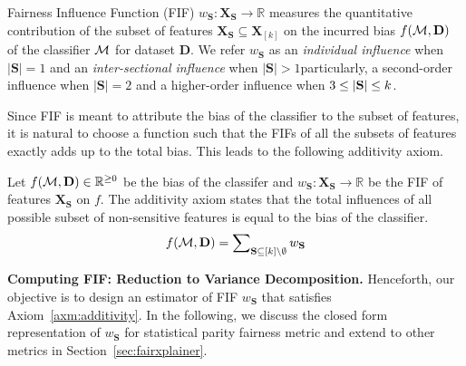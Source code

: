 \begin{definition}
Fairness Influence Function (FIF) $ w_{\mathbf{S}}:\mathbf{X}_{\mathbf{S}} \rightarrow \mathbb{R} $ measures the quantitative contribution of the subset of features $ \mathbf{X}_{\mathbf{S}} \subseteq \mathbf{X}_{[k]}$ on the incurred bias $ f(\mathcal{M}, \mathbf{D}) $ of the classifier $ \mathcal{M} $ for dataset $\mathbf{D}$. We refer $ w_{\mathbf{S}} $ as an \emph{individual influence} when $ |\mathbf{S}| = 1 $ and an \emph{inter-sectional influence} when $ |\mathbf{S}| > 1 $\textemdash particularly, a second-order influence when $ |\mathbf{S}| = 2 $ and a higher-order influence when $ 3 \le |\mathbf{S}| \le k $. %
\end{definition}	
Since FIF is meant to attribute the bias of the classifier to the subset of features, it is natural to choose a function such that the FIFs of all the subsets of features exactly adds up to the total bias. This leads to the following additivity axiom.
\begin{axiom}
	\label{axm:additivity}
	Let $ f(\mathcal{M}, \mathbf{D}) \in \mathbb{R}^{\geq 0}$ be the bias of the classifer and $ w_{\mathbf{S}}:\mathbf{X}_{\mathbf{S}} \rightarrow \mathbb{R} $ be the FIF of features $ \mathbf{X}_{\mathbf{S}} $ on $ f $. The additivity axiom states that the total influences of all possible subset of non-sensitive features is equal to the bias of the classifier.
	\begin{align}\label{eq:constraint_framework}
		f(\mathcal{M}, \mathbf{D}) = \sum\nolimits_{\mathbf{S} \subseteq [k] \setminus \emptyset} w_{\mathbf{S}}
	\end{align}
\end{axiom}
\noindent\textbf{Computing FIF: Reduction to Variance Decomposition.} Henceforth, our objective is to design an estimator of FIF $ w_\mathbf{S} $ that satisfies Axiom~\ref{axm:additivity}. In the following, we discuss the closed form representation of $ w_{\mathbf{S}} $ for statistical parity fairness metric and extend to other metrics in Section~\ref{sec:fairxplainer}.




